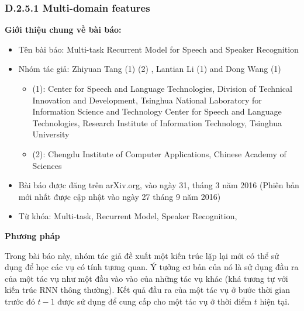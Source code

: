 \documentclass{article}
\begin{document}
	\subsubsection{D.2.5.1 Multi-domain features}
	\textbf{Giới thiệu chung về bài báo:}
	\begin{itemize}
		\item Tên bài báo: Multi-task Recurrent Model for Speech and Speaker Recognition
		\item Nhóm tác giả: Zhiyuan Tang (1) (2) , Lantian Li (1) and Dong Wang (1)
		\begin{itemize}
			\item (1): Center for Speech and Language Technologies, Division of Technical Innovation and Development,
			Tsinghua National Laboratory for Information Science and Technology
			Center for Speech and Language Technologies, Research Institute of Information Technology, Tsinghua University
			\item (2): Chengdu Institute of Computer Applications, Chinese Academy of Sciences
		\end{itemize}
		\item Bài báo được đăng trên arXiv.org, vào ngày 31, tháng 3 năm 2016 (Phiên bản mới nhất được cập nhật vào ngày 27 tháng 9 năm 2016)
		\item Từ khóa: Multi-task, Recurrent Model, Speaker Recognition, 
	\end{itemize}
	\textbf{Phương pháp}
	
	Trong bài báo này, nhóm tác giả đề xuất một kiến trúc lặp lại mới có thể sử dụng để học các vụ có tính tương quan. Ý tưởng cơ bản của nó là sử dụng đầu ra của một tác vụ như một đầu vào vào của những tác vụ khác (khá tương tự với kiến trúc RNN thông thường). Kết quả đầu ra của một tác vụ ở bước thời gian trước đó $t-1$ được sử dụng để cung cấp cho một tác vụ ở thời điểm $t$ hiện tại.
	
\end{document}
